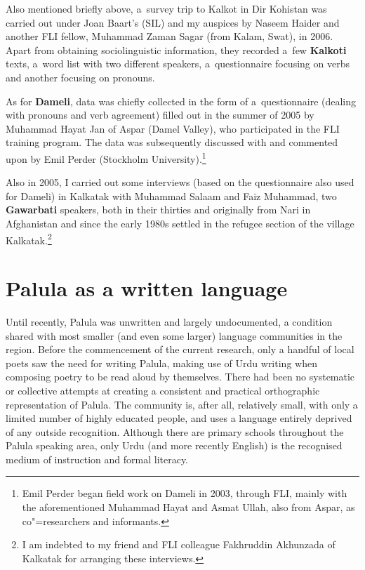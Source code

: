 Also mentioned briefly above, a~survey trip to Kalkot in Dir Kohistan was carried out under Joan
Baart's (SIL) and my auspices by Naseem Haider and another FLI fellow, Muhammad Zaman Sagar (from
Kalam, Swat), in 2006. Apart from obtaining sociolinguistic information, they recorded a~few
\textbf{Kalkoti} texts, a~word list with two different speakers, a~questionnaire focusing on verbs
and another focusing on pronouns.


As for \textbf{Dameli}, data was chiefly collected in the form of a~questionnaire (dealing with
pronouns and verb agreement) filled out in the summer of 2005 by Muhammad Hayat Jan of Aspar (Damel
Valley), who participated in the FLI training program. The data was subsequently discussed with and
commented upon by Emil Perder (Stockholm University).\footnote{Emil Perder began field work on
  Dameli in 2003, through FLI, mainly with the aforementioned Muhammad Hayat and Asmat Ullah, also
  from Aspar, as co"=researchers and informants.}


Also in 2005, I carried out some interviews (based on the questionnaire also used for Dameli) in Kalkatak with Muhammad Salaam and Faiz Muhammad, two \textbf{Gawarbati} speakers, both in their thirties and originally from Nari in Afghanistan and since the early 1980s settled in the refugee section of the village Kalkatak.\footnote{I am indebted to my friend and FLI colleague Fakhruddin Akhunzada of Kalkatak for arranging these interviews.}


\section{Palula as a written language}
\label{sec:1-6b}

Until recently, Palula was unwritten and largely undocumented, a condition shared with most smaller (and even some larger) language communities in the region. Before the commencement of the current research, only a handful of local poets saw the need for writing Palula, making use of Urdu writing when composing poetry to be read aloud by themselves. There had been no systematic or collective attempts at creating a consistent and practical orthographic representation of Palula. The community is, after all, relatively small, with only a limited number of highly educated people, and uses a language entirely deprived of any outside recognition. Although there are primary schools throughout the Palula speaking area, only Urdu (and more recently English) is the recognised medium of instruction and formal literacy.



